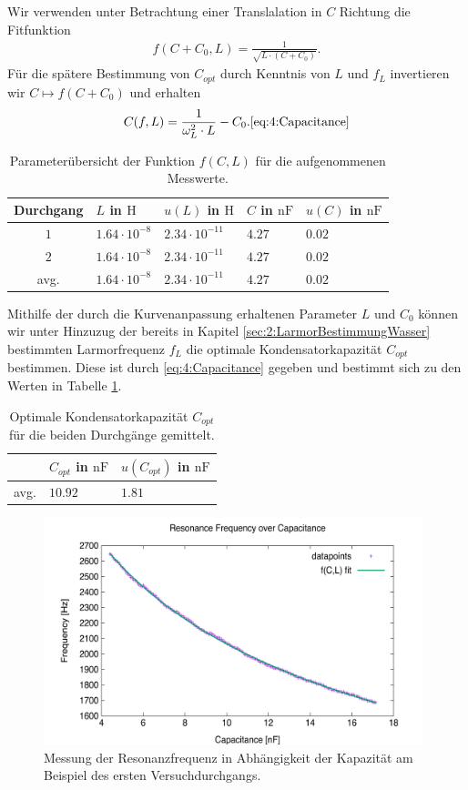 \documentclass{article}
\begin{document}
    Wir verwenden unter Betrachtung einer Translalation in $C$ Richtung die Fitfunktion
    \begin{align}
        f(C + C_0,L) = \frac{1}{\sqrt{L\cdot (C + C_0)}}.
    \end{align}
    Für die spätere Bestimmung von $C_{opt}$ durch Kenntnis von $L$ und $f_L$ invertieren wir $C\mapsto f(C + C_0)$ und erhalten 
    \begin{align}
        C(f,L) = \frac{1}{\omega_L^2\cdot L} - C_0. \ref{eq:4:Capacitance}
    \end{align}

    \begin{table}[h]
        \centering
        \begin{tabular}{c|ll|ll}
             \textbf{Durchgang} & $L$ in $\si{\henry}$ & $u(L)$ in $\si{\henry}$ & $C$ in $\si{\nano\farad}$ & $u(C)$ in $\si{\nano\farad}$ \\
            \hline
            $1$ & $1.64\cdot 10^{-8}$ & $2.34\cdot 10^{-11}$ & $4.27$ & $0.02$ \\
            $2$ & $1.64\cdot 10^{-8}$ & $2.34\cdot 10^{-11}$ & $4.27$ & $0.02$ \\
            \hline
            avg. & $1.64\cdot 10^{-8}$ & $2.34\cdot 10^{-11}$ & $4.27$ & $0.02$
        \end{tabular} 
        \caption{Parameterübersicht der Funktion $f(C,L)$ für die aufgenommenen Messwerte.}
    \end{table}

    Mithilfe der durch die Kurvenanpassung erhaltenen Parameter $L$ und $C_0$ können wir unter Hinzuzug der bereits in Kapitel \ref{sec:2:LarmorBestimmungWasser} bestimmten Larmorfrequenz $f_L$ die optimale Kondensatorkapazität $C_{opt}$ bestimmen. Diese ist durch \eqref{eq:4:Capacitance} gegeben und bestimmt sich zu den Werten in Tabelle \ref{tab:4:OptimalCapacitance}.
    \begin{table}
        \centering
        \begin{tabular}{c|ll}
             & $C_{opt}$ in $\si{\nano\farad}$ & $u(C_{opt})$ in $\si{\nano\farad}$ \\
            \hline
            avg. & $10.92$ & $1.81$
        \end{tabular}
        \caption{Optimale Kondensatorkapazität $C_{opt}$ für die beiden Durchgänge gemittelt.}
        \label{tab:4:OptimalCapacitance}
    \end{table}

    \begin{figure}[h]
        \centering
        \includegraphics[width=11cm]{../Bilddateien/Messung1_Resonance_Freq_vs_Capacitance.png}
        \caption{Messung der Resonanzfrequenz in Abhängigkeit der Kapazität am Beispiel des ersten Versuchdurchgangs.}
    \end{figure}
\end{document}
